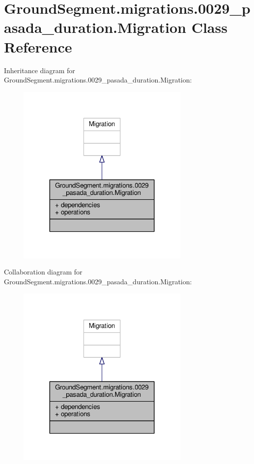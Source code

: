 \hypertarget{class_ground_segment_1_1migrations_1_10029__pasada__duration_1_1_migration}{}\section{Ground\+Segment.\+migrations.0029\+\_\+pasada\+\_\+duration.Migration Class Reference}
\label{class_ground_segment_1_1migrations_1_10029__pasada__duration_1_1_migration}


Inheritance diagram for Ground\+Segment.\+migrations.0029\+\_\+pasada\+\_\+duration.Migration\+:\nopagebreak
\begin{figure}[H]
\begin{center}
\leavevmode
\includegraphics[width=239pt]{class_ground_segment_1_1migrations_1_10029__pasada__duration_1_1_migration__inherit__graph}
\end{center}
\end{figure}


Collaboration diagram for Ground\+Segment.\+migrations.0029\+\_\+pasada\+\_\+duration.Migration\+:\nopagebreak
\begin{figure}[H]
\begin{center}
\leavevmode
\includegraphics[width=239pt]{class_ground_segment_1_1migrations_1_10029__pasada__duration_1_1_migration__coll__graph}
\end{center}
\end{figure}
